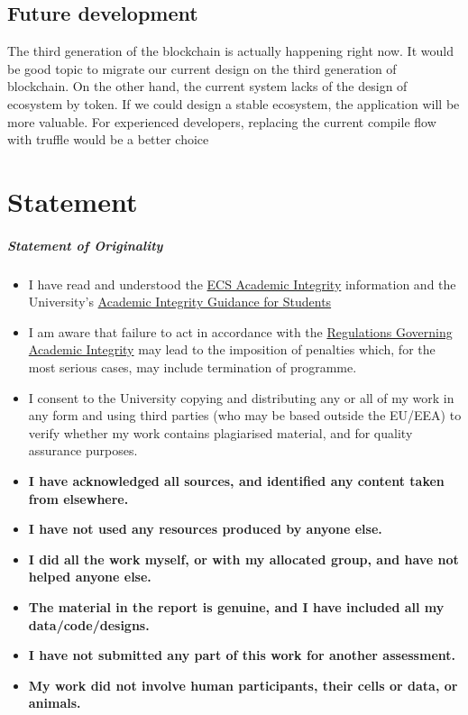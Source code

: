 \documentclass[openany,12pt]{ecsthesis}      %
\begin{document}
\section{Future development}
The third generation of the blockchain is actually happening right now. 
It would be good topic to migrate our current design on the third generation of blockchain.
On the other hand, the current system lacks of the design of ecosystem by token.
If we could design a stable ecosystem, the application will be more valuable. 
For experienced developers, replacing the current compile flow with truffle \cite{truffle} would be a better choice
\chapter{Statement}
\paragraph{Statement of Originality}
\begin{itemize}
  \item I have read and understood the \href{https://secure.ecs.soton.ac.uk/notes/ai/}{ECS Academic Integrity} information and the University’s 
  \href{https://secure.ecs.soton.ac.uk/notes/ai/}{Academic Integrity Guidance for Students}
  \item I am aware that failure to act in accordance with the \href{https://secure.ecs.soton.ac.uk/notes/ai/}{Regulations Governing Academic Integrity} may lead to the imposition of penalties which, for the most serious cases, may include termination of programme.
  \item I consent to the University copying and distributing any or all of my work in any form and using third parties (who may be based outside the EU/EEA) to verify whether my work contains plagiarised material, and for quality assurance purposes.
  \item \textbf{I have acknowledged all sources, and identified any content taken from elsewhere.}
  \item \textbf{I have not used any resources produced by anyone else.}
  \item \textbf{I did all the work myself, or with my allocated group, and have not helped anyone else.}
  \item \textbf{The material in the report is genuine, and I have included all my data/code/designs.}
  \item \textbf{I have not submitted any part of this work for another assessment.}
  \item \textbf{My work did not involve human participants, their cells or data, or animals.}
\end{itemize}
\backmatter


\end{document}
